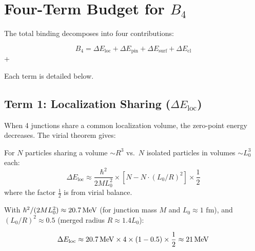 \section{Four-Term Budget for $B_4$}
\label{sec:he4:budget}

The total binding decomposes into four contributions:

\begin{derivationbox}
    \begin{equation}
        B_4 = \Delta E_{\text{loc}} + \Delta E_{\text{pin}}
            + \Delta E_{\text{surf}} + \Delta E_{\text{cl}}
        \label{eq:four_term}
    \end{equation}
    \tagDc + \tagP
\end{derivationbox}

Each term is detailed below.

\subsection{Term 1: Localization Sharing ($\Delta E_{\text{loc}}$)}
\label{sec:he4:loc}

When 4 junctions share a common localization volume, the zero-point
energy decreases. The virial theorem gives:

\begin{derivationbox}
    For $N$ particles sharing a volume $\sim R^3$ vs.\ $N$ isolated
    particles in volumes $\sim L_0^3$ each:
    \begin{equation}
        \Delta E_{\text{loc}} \approx \frac{\hbar^2}{2M L_0^2}
        \times \left[ N - N \cdot (L_0/R)^{2} \right]
        \times \frac{1}{2}
        \label{eq:loc_formula}
    \end{equation}
    where the factor $\frac{1}{2}$ is from virial balance.
    \tagP
\end{derivationbox}

With $\hbar^2/(2M L_0^2) \approx 20.7\,\mathrm{MeV}$ (for junction mass $M$
and $L_0 \approx 1\text{ fm}$), and $(L_0/R)^{2} \approx 0.5$
(merged radius $R \approx 1.4 L_0$):

\begin{equation}
    \Delta E_{\text{loc}} \approx 20.7\,\mathrm{MeV} \times 4 \times (1 - 0.5)
    \times \frac{1}{2} \approx 21\,\mathrm{MeV}
    \label{eq:loc_value}
\end{equation}

